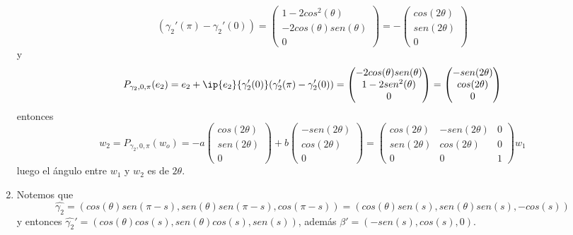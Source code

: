 \documentclass{article}
\begin{document}
\begin{enumerate}
\begin{equation*}
        (\gamma_{2}'(\pi)-\gamma_{2}'(0))=\begin{pmatrix}
            1-2cos^{2}(\theta) \\ -2cos(\theta)sen(\theta) \\ 0
        \end{pmatrix}=-\begin{pmatrix}
            cos(2\theta) \\ sen(2\theta) \\ 0
        \end{pmatrix}
    \end{equation*}
    y
    \begin{equation*}
        P_{\gamma_{2},0,\pi}(e_{2})=e_{2}+\ip{e_{2}}{\gamma_{2}'(0)}
        (\gamma_{2}'(\pi)-\gamma_{2}'(0))=\begin{pmatrix}
            -2cos(\theta)sen(\theta) \\ 1-2sen^{2}(\theta) \\ 0
        \end{pmatrix}=\begin{pmatrix}
            -sen(2\theta) \\ cos(2\theta) \\ 0
        \end{pmatrix}
    \end{equation*}
    entonces
    \begin{equation*}
        w_{2}=P_{\gamma_{2},0,\pi}(w_{o})=-a\begin{pmatrix}
            cos(2\theta) \\ sen(2\theta) \\ 0
        \end{pmatrix}+b\begin{pmatrix}
            -sen(2\theta) \\ cos(2\theta) \\ 0
        \end{pmatrix}=\begin{pmatrix}
            cos(2\theta) & -sen(2\theta) & 0 \\ sen(2\theta) & cos(2\theta) & 0 \\ 0 & 0 & 1
        \end{pmatrix}w_{1}
    \end{equation*}
    luego el ángulo entre $w_{1}$ y $w_{2}$ es de $2\theta$.

    \item Notemos que
    \begin{equation*}
        \widehat{\gamma_{2}}=(cos(\theta)sen(\pi-s),sen(\theta)sen(\pi-s),cos(\pi-s))
        =(cos(\theta)sen(s),sen(\theta)sen(s),-cos(s))
    \end{equation*}
    y entonces $\widehat{\gamma_{2}}'=(cos(\theta)cos(s),sen(\theta)cos(s),sen(s))$, además
    $\beta'=(-sen(s),cos(s),0)$.
    

\end{enumerate}
\end{document}
